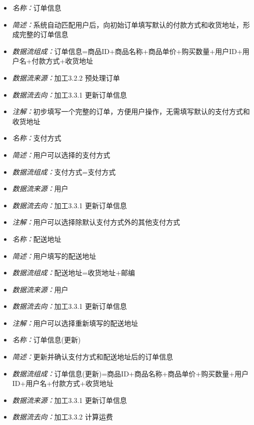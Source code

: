 \vspace{-1mm}

\begin{itemize}
	\item \textit{名称：}订单信息
	\item \textit{简述：}系统自动匹配用户后，向初始订单填写默认的付款方式和收货地址，形成完整的订单信息
	\item \textit{数据流组成：}订单信息=商品ID+商品名称+商品单价+购买数量+用户ID+用户名+付款方式+收货地址
	\item \textit{数据流来源：}加工3.2.2 预处理订单
	\item \textit{数据流去向：}加工3.3.1 更新订单信息
	\item \textit{注解：}初步填写一个完整的订单，方便用户操作，无需填写默认的支付方式和收货地址
\end{itemize}

\vspace{-1mm}

\begin{itemize}
	\item \textit{名称：}支付方式
	\item \textit{简述：}用户可以选择的支付方式
	\item \textit{数据流组成：}支付方式=支付方式
	\item \textit{数据流来源：}用户
	\item \textit{数据流去向：}加工3.3.1 更新订单信息
	\item \textit{注解：}用户可以选择除默认支付方式外的其他支付方式
\end{itemize}

\vspace{-1mm}

\begin{itemize}
	\item \textit{名称：}配送地址
	\item \textit{简述：}用户填写的配送地址
	\item \textit{数据流组成：}配送地址=收货地址+邮编
	\item \textit{数据流来源：}用户
	\item \textit{数据流去向：}加工3.3.1 更新订单信息
	\item \textit{注解：}用户可以选择重新填写的配送地址
\end{itemize}

\vspace{-1mm}

\begin{itemize}
	\item \textit{名称：}订单信息(更新)
	\item \textit{简述：}更新并确认支付方式和配送地址后的订单信息
	\item \textit{数据流组成：}订单信息(更新)=商品ID+商品名称+商品单价+购买数量+用户ID+用户名+付款方式+收货地址
	\item \textit{数据流来源：}加工3.3.1 更新订单信息
	\item \textit{数据流去向：}加工3.3.2 计算运费
\end{itemize}

